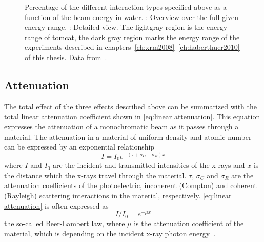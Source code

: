 \def\width{0.5\linewidth}%
\def\height{0.309\linewidth}%
\begin{figure}%
	\noindent{}%
	\caption[Interaction types]{Percentage of the different interaction types specified above as a function of the beam energy in water. : Overview over the full given energy range. : Detailed view. The lightgray region is the energy-range of \ac{tomcat}, the dark gray region marks the energy range of the experiments described in chapters~\ref{ch:xrm2008}--\ref{ch:haberthuer2010} of this thesis. Data from~\citet[Table 5-5]{Johns1983}.}%
	\label{fig:InteractionPercentage}%
\end{figure}%

\subsection{Attenuation}
The total effect of the three effects described above can be summarized with the total linear attenuation coefficient shown in \autoref{eq:linear attenuation}. This equation expresses the attenuation of a monochromatic beam as it passes through a material. The attenuation in a material of uniform density and atomic number can be expressed by an exponential relationship%
\begin{equation}%
	I=I_{0}e^{-(\tau+\sigma_{C}+\sigma_{R})x}%
	\label{eq:linear attenuation}%
\end{equation}%
where $I$ and $I_{0}$ are the incident and transmitted intensities of the x-rays and $x$ is the distance which the x-rays travel through the material. $\tau$, $\sigma_{C}$ and $\sigma_{R}$ are the attenuation coefficients of the photoelectric, incoherent (Compton) and coherent (Rayleigh) scattering interactions in the material, respectively. \autoref{eq:linear attenuation} is often expressed as
\begin{equation}
	I/I_{0}=e^{-\mu x}
	\label{eq:beer-lambert}
\end{equation}%
the so-called Beer-Lambert law, where $\mu$ is the attenuation coefficient of the material, which is depending on the incident x-ray photon energy~\cite{Hsieh2003}. 

